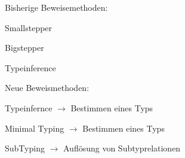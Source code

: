 {
    \begin{itemgroup}{Bisherige Beweisemethoden:}
	\item Smallstepper
	\item Bigstepper
	\item Typeinference
	\end{itemgroup}
    
	\begin{itemgroup}{Neue Beweismethoden:}
	\item Typeinfernce $\to$ Bestimmen eines Typs
	\item Minimal Typing $\to$ Bestimmen eines Typs
	\item SubTyping $\to$ Auflösung von Subtyprelationen
	\end{itemgroup}
  
}